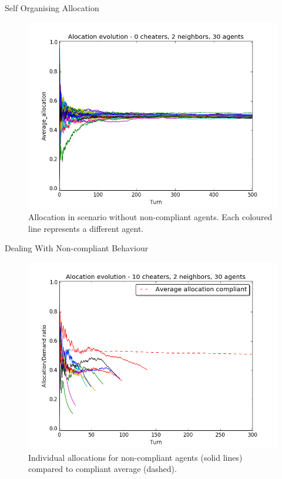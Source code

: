 \begin{frame}{Self Organising Allocation}

\begin{figure}[htbp]
\centering
\includegraphics{pics/lpgp_0cheaters_2nei_30agents-alloc.png}
\caption{Allocation in scenario without non-compliant agents. Each
coloured line represents a different agent.}
\end{figure}

\end{frame}

\begin{frame}{Dealing With Non-compliant Behaviour}

\begin{figure}[htbp]
\centering
\includegraphics{pics/lpgp_10cheaters_2nei_30agents-alloc.png}
\caption{Individual allocations for non-compliant agents (solid lines)
compared to compliant average (dashed).}
\end{figure}

\end{frame}

